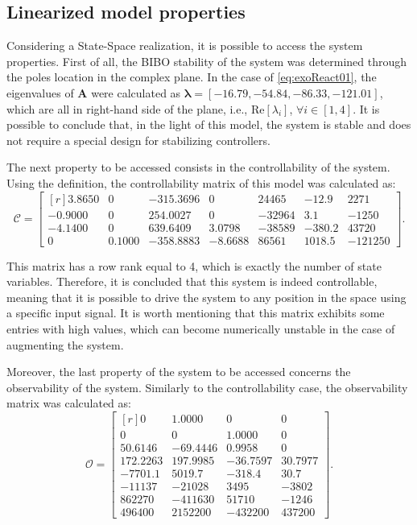 \documentclass[a4paper,11pt]{book}
\numberwithin{figure}{chapter}
\numberwithin{equation}{chapter}
\numberwithin{table}{chapter}
\theoremstyle{definition}
\begin{document}
\subsection{Linearized model properties}

Considering a State-Space realization, it is possible to access the system properties. First of all, the BIBO stability of the system was determined through the poles location in the complex plane. In the case of \eqref{eq:exoReact01}, the eigenvalues of $\bm{A}$ were calculated as $\bm{\lambda} = [-16.79, -54.84, -86.33, -121.01]$, which are all in right-hand side of the plane, i.e., $\text{Re}[\lambda_i]$, $\forall i \in [1,4]$. It is possible to conclude that, in the light of this model, the system is stable and does not require a special design for stabilizing controllers.

The next property to be accessed consists in the controllability of the system. Using the definition, the controllability matrix of this model was calculated as:
\begin{equation}
	\bm{\mathcal{C}} = \begin{bmatrix*}[r]
	 3.8650  &      0 & -315.3696  &       0   &  24465 & -12.9 & 2271  \\
   -0.9000   &      0 &  254.0027  &       0   & -32964 & 3.1  & -1250 \\
   -4.1400  &      0  &  639.6409  &  3.0798   & -38589 & -380.2  & 43720 \\
         0  &  0.1000 & -358.8883  &   -8.6688 &  86561 & 1018.5  & -121250 
	\end{bmatrix*}
.\end{equation}

\noindent This matrix has a row rank equal to 4, which is exactly the number of state variables. Therefore, it is concluded that this system is indeed controllable, meaning that it is possible to drive the system to any position in the space using a specific input signal. It is worth mentioning that this matrix exhibits some entries with high values, which can become numerically unstable in the case of augmenting the system.

Moreover, the last property of the system to be accessed concerns the observability of the system. Similarly to the controllability case, the observability matrix was calculated as:
\begin{equation}
	\bm{\mathcal{O}} = \begin{bmatrix*}[r]
         0 &   1.0000 &        0  &       0 \\	
         0 &        0 &   1.0000  &       0 \\ 
   50.6146 & -69.4446 &   0.9958  &       0 \\
  172.2263 & 197.9985 & -36.7597  & 30.7977 \\
   -7701.1 &   5019.7 &  -318.4  &  30.7 \\
   -11137 &  -21028 &   3495 &  -3802 \\
   862270  & -411630  &  51710  & -1246 \\
   496400  &  2152200 &  -432200  &  437200
	\end{bmatrix*}
.\end{equation}
\end{document}
